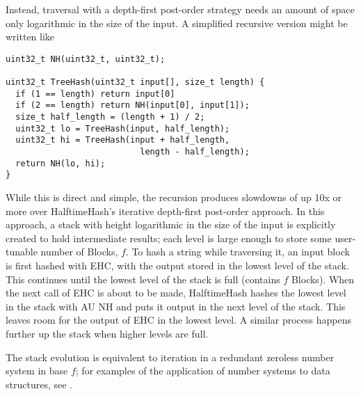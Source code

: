 \documentclass[sigconf, nonacm]{acmart}
\begin{document}
Instead, traversal with a depth-first post-order strategy needs an amount of space only logarithmic in the size of the input.
A simplified recursive version might be written like

\begin{lstlisting}
uint32_t NH(uint32_t, uint32_t);

uint32_t TreeHash(uint32_t input[], size_t length) {
  if (1 == length) return input[0]
  if (2 == length) return NH(input[0], input[1]);
  size_t half_length = (length + 1) / 2;
  uint32_t lo = TreeHash(input, half_length);
  uint32_t hi = TreeHash(input + half_length,
                           length - half_length);
  return NH(lo, hi);
}
\end{lstlisting}

While this is direct and simple, the recursion produces slowdowns of up 10x or more over HalftimeHash's iterative depth-first post-order approach.
In this approach, a stack with height logarithmic in the size of the input is explicitly created to hold intermediate results; each level is large enough to store some user-tunable number of Blocks, $f$.
To hash a string while traversing it, an input block is first hashed with EHC, with the output stored in the lowest level of the stack.
This continues until the lowest level of the stack is full (contains $f$ Blocks).
When the next call of EHC is about to be made, HalftimeHash hashes the lowest level in the stack with AU NH and puts it output in the next level of the stack.
This leaves room for the output of EHC in the lowest level.
A similar process happens further up the stack when higher levels are full.

The stack evolution is equivalent to iteration in a redundant zeroless number system in base $f$; for examples of the application of number systems to data structures, see \cite{redundant-zeroless}.

\end{document}
